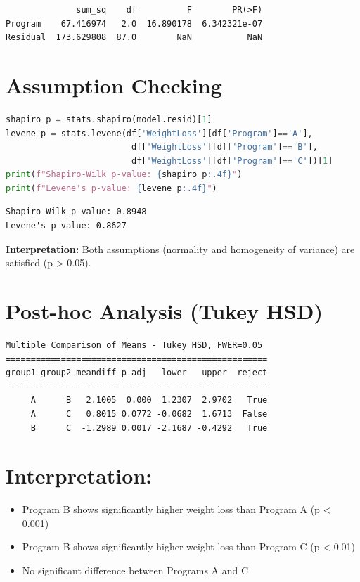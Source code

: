 \documentclass[12pt, a4paper]{article}
\begin{document}
\begin{outputbox}
\begin{verbatim}
              sum_sq    df          F        PR(>F)
Program    67.416974   2.0  16.890178  6.342321e-07
Residual  173.629808  87.0        NaN           NaN
\end{verbatim}
\end{outputbox}


\section*{Assumption Checking}
\begin{lstlisting}[language=Python]
shapiro_p = stats.shapiro(model.resid)[1]
levene_p = stats.levene(df['WeightLoss'][df['Program']=='A'],
                         df['WeightLoss'][df['Program']=='B'],
                         df['WeightLoss'][df['Program']=='C'])[1]
print(f"Shapiro-Wilk p-value: {shapiro_p:.4f}")
print(f"Levene's p-value: {levene_p:.4f}")
\end{lstlisting}

\begin{outputbox}
\begin{verbatim}
Shapiro-Wilk p-value: 0.8948
Levene's p-value: 0.8627
\end{verbatim}
\end{outputbox}

\textbf{\textcolor{RoyalNavy}{Interpretation:}} Both assumptions (normality and homogeneity of variance) are satisfied (p > 0.05).

\section*{Post-hoc Analysis (Tukey HSD)}
\begin{outputbox}
\begin{verbatim}
Multiple Comparison of Means - Tukey HSD, FWER=0.05
====================================================
group1 group2 meandiff p-adj   lower   upper  reject
----------------------------------------------------
     A      B   2.1005  0.000  1.2307  2.9702   True
     A      C   0.8015 0.0772 -0.0682  1.6713  False
     B      C  -1.2989 0.0017 -2.1687 -0.4292   True
\end{verbatim}
\end{outputbox}

\section*{Interpretation:} 
\begin{itemize}
    \item Program B shows significantly higher weight loss than Program A (p < 0.001)
    \item Program B shows significantly higher weight loss than Program C (p < 0.01)
    \item No significant difference between Programs A and C
\end{itemize}
\end{document}
